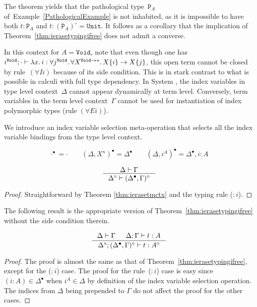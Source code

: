 \begin{example}\label{PathologicalExampleContinued}
The theorem yields that the pathological type~$\mathtt P_A$
of~Example~\ref{PathologicalExample} is not inhabited, as it is impossible
to have both $t:\mathtt P_A$ and $t:(\mathtt P_A)^\circ=\mathtt{Unit}$.
It follows as a corollary that the implication of
Theorem~\ref{thm:ierasetypingifree} does not admit a converse.

In this context for $A=\mathtt{Void}$, note that even though one has
$i^\mathtt{Void};\cdot\vdash\lambda x.\,i:\forall
j^{\mathtt{Void}}.\,\forall X^{\mathtt{Void}\to*}.\, X\{i\}\to X\{j\}$, 
this open term %
cannot be closed by rule~$(\forall Ii)$ because of its side
condition.  This is in stark contrast to what is possible in calculi with
full type dependency. In System \Fi, the index variables
in type level context~$\Delta$ cannot appear dynamically at term level.
Conversely, term variables in the term level context~$\Gamma$ cannot be
used for instantiation of index polymorphic types (rule $(\forall Ei)$).

\end{example}

We introduce an index variable selection meta-operation that selects all
the index variable bindings from the type level context.

\begin{definition}
\[ \cdot^\bullet = \cdot \qquad
	(\Delta,X^\kappa)^\bullet = \Delta^\bullet \qquad
	(\Delta,i^A)^\bullet = \Delta^\bullet,i:A
\]
\end{definition}

\begin{theorem}
\label{thm:ierasetmctxivs}
\[ \inference{\Delta |- \Gamma}{\Delta^\circ |- (\Delta^\bullet,\Gamma)^\circ}
\]
\end{theorem}
\begin{proof}
Straightforward by Theorem \ref{thm:ierasetmctx} and the typing rule ($:i$).
\end{proof}

The following result is the appropriate version of
Theorem~\ref{thm:ierasetypingifree} without the side condition therein.

\begin{theorem}
\label{thm:ierasetypingall}
\[ \inference{\Delta |- \Gamma & \Delta;\Gamma |- t : A}
		{\Delta^\circ;(\Delta^\bullet,\Gamma)^\circ |- t : A^\circ}
\]
\end{theorem}
\begin{proof}
	The proof is almost the same as that of
	Theorem~\ref{thm:ierasetypingifree}, except for the ($:i$) case.
	The proof for the rule~($:i$) case is easy
	since $(i:A) \in \Delta^\bullet$ when $i^A \in \Delta$ by definition of
	the index variable selection operation. The indices from $\Delta$
	being prepended to $\Gamma$ do not affect the proof for the other cases.
\end{proof}

